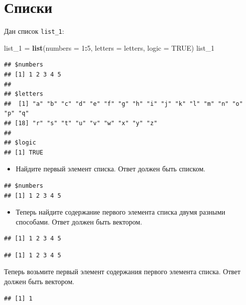 \documentclass[]{book}
\newenvironment{Shaded}{\begin{snugshade}}{\end{snugshade}}
\newcommand{\DataTypeTok}[1]{\textcolor[rgb]{0.13,0.29,0.53}{#1}}
\newcommand{\DecValTok}[1]{\textcolor[rgb]{0.00,0.00,0.81}{#1}}
\newcommand{\KeywordTok}[1]{\textcolor[rgb]{0.13,0.29,0.53}{\textbf{#1}}}
\newcommand{\NormalTok}[1]{#1}
\newcommand{\OperatorTok}[1]{\textcolor[rgb]{0.81,0.36,0.00}{\textbf{#1}}}
\newcommand{\OtherTok}[1]{\textcolor[rgb]{0.56,0.35,0.01}{#1}}
\newcommand{\StringTok}[1]{\textcolor[rgb]{0.31,0.60,0.02}{#1}}
\providecommand{\tightlist}{%
  \setlength{\itemsep}{0pt}\setlength{\parskip}{0pt}}
\begin{document}
\hypertarget{list_ta}{%
\section{Списки}\label{list_ta}}

Дан список \texttt{list\_1}:

\begin{Shaded}
\begin{Highlighting}[]
\NormalTok{list_}\DecValTok{1}\NormalTok{ =}\StringTok{ }\KeywordTok{list}\NormalTok{(}\DataTypeTok{numbers =} \DecValTok{1}\OperatorTok{:}\DecValTok{5}\NormalTok{, }\DataTypeTok{letters =}\NormalTok{ letters, }\DataTypeTok{logic =} \OtherTok{TRUE}\NormalTok{)}
\NormalTok{list_}\DecValTok{1}
\end{Highlighting}
\end{Shaded}

\begin{verbatim}
## $numbers
## [1] 1 2 3 4 5
## 
## $letters
##  [1] "a" "b" "c" "d" "e" "f" "g" "h" "i" "j" "k" "l" "m" "n" "o" "p" "q"
## [18] "r" "s" "t" "u" "v" "w" "x" "y" "z"
## 
## $logic
## [1] TRUE
\end{verbatim}

\begin{itemize}
\tightlist
\item
  Найдите первый элемент списка. Ответ должен быть списком.
\end{itemize}

\begin{verbatim}
## $numbers
## [1] 1 2 3 4 5
\end{verbatim}

\begin{itemize}
\tightlist
\item
  Теперь найдите содержание первого элемента списка двумя разными способами. Ответ должен быть вектором.
\end{itemize}

\begin{verbatim}
## [1] 1 2 3 4 5
\end{verbatim}

\begin{verbatim}
## [1] 1 2 3 4 5
\end{verbatim}

Теперь возьмите первый элемент содержания первого элемента списка. Ответ должен быть вектором.

\begin{verbatim}
## [1] 1
\end{verbatim}
\end{document}
